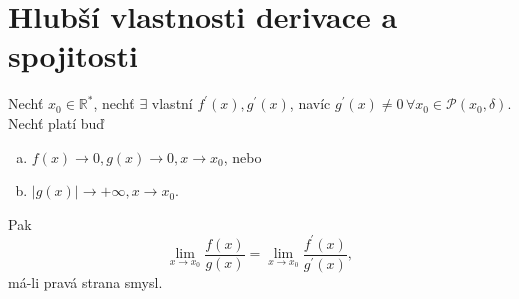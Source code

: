
\section{Hlubší vlastnosti derivace a spojitosti}

\begin{veta}[L'Hospital]
  Nechť $x_0 \in \mathbb R^*$, nechť $\exists$ vlastní $f^\prime (x), g^\prime (x)$, navíc $g^\prime (x) \neq 0 \,\forall x_0 \in \mathscr P(x_0, \delta)$. Nechť platí buď
\begin{enumerate}[a)]
  \item $f(x) \to 0, g(x) \to 0, x \to x_0$, nebo
  \item $|g(x)| \to +\infty, x \to x_0$.
\end{enumerate}
  Pak
  $$\lim_{x \to x_0} \frac{f(x)}{g(x)} = \lim_{x \to x_0} \frac{f^\prime(x)}{g^\prime(x)},$$
  má-li pravá strana smysl.
\end{veta}

